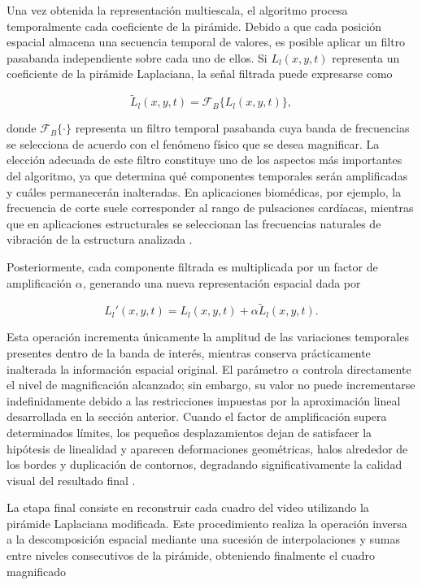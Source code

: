 Una vez obtenida la representación multiescala, el algoritmo procesa temporalmente cada coeficiente de la pirámide. Debido a que cada posición espacial almacena una secuencia temporal de valores, es posible aplicar un filtro pasabanda independiente sobre cada uno de ellos. Si $L_l(x,y,t)$ representa un coeficiente de la pirámide Laplaciana, la señal filtrada puede expresarse como

\begin{equation}
\widetilde{L}_l(x,y,t)=\mathcal{F}_B\{L_l(x,y,t)\},
\end{equation}

donde $\mathcal{F}_B\{\cdot\}$ representa un filtro temporal pasabanda cuya banda de frecuencias se selecciona de acuerdo con el fenómeno físico que se desea magnificar. La elección adecuada de este filtro constituye uno de los aspectos más importantes del algoritmo, ya que determina qué componentes temporales serán amplificadas y cuáles permanecerán inalteradas. En aplicaciones biomédicas, por ejemplo, la frecuencia de corte suele corresponder al rango de pulsaciones cardíacas, mientras que en aplicaciones estructurales se seleccionan las frecuencias naturales de vibración de la estructura analizada \cite{ahmed2023overview}.

Posteriormente, cada componente filtrada es multiplicada por un factor de amplificación $\alpha$, generando una nueva representación espacial dada por

\begin{equation}
L_l'(x,y,t)=L_l(x,y,t)+\alpha\widetilde{L}_l(x,y,t).
\end{equation}

Esta operación incrementa únicamente la amplitud de las variaciones temporales presentes dentro de la banda de interés, mientras conserva prácticamente inalterada la información espacial original. El parámetro $\alpha$ controla directamente el nivel de magnificación alcanzado; sin embargo, su valor no puede incrementarse indefinidamente debido a las restricciones impuestas por la aproximación lineal desarrollada en la sección anterior. Cuando el factor de amplificación supera determinados límites, los pequeños desplazamientos dejan de satisfacer la hipótesis de linealidad y aparecen deformaciones geométricas, halos alrededor de los bordes y duplicación de contornos, degradando significativamente la calidad visual del resultado final \cite{wu2012eulerian,ahmed2023overview}.

La etapa final consiste en reconstruir cada cuadro del video utilizando la pirámide Laplaciana modificada. Este procedimiento realiza la operación inversa a la descomposición espacial mediante una sucesión de interpolaciones y sumas entre niveles consecutivos de la pirámide, obteniendo finalmente el cuadro magnificado

